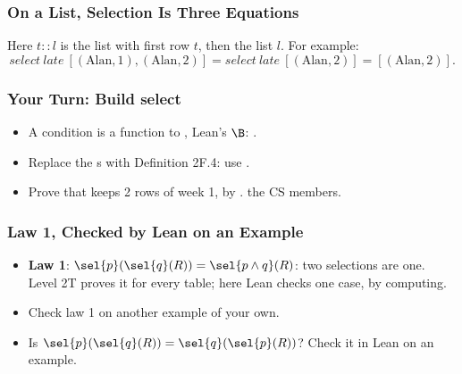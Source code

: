\documentclass{ltx-talk}
\begin{document}
\begin{frame}
  \frametitle{On a List, Selection Is Three Equations}
  Here $t :: l$ is the list with first row $t$, then the list $l$. For
  example:
  \[
    \mathit{select}\ \mathit{late}\ [(\text{Alan}, 1), (\text{Alan}, 2)]
    = \mathit{select}\ \mathit{late}\ [(\text{Alan}, 2)]
    = [(\text{Alan}, 2)].
  \]
\end{frame}


\begin{frame*}
  \frametitle{Your Turn: Build select}
  \begin{itemize}
    \item A condition is a function to , Lean's $\B$:
      .
    \item {} Replace the s with Definition 2F.4: use
      .
    \item {} Prove that  keeps 2 rows of week 1, by
      .   the CS members.
  \end{itemize}
\end{frame*}

\begin{frame*}
  \frametitle{Law 1, Checked by Lean on an Example}
  \begin{itemize}
    \item \textbf{Law 1}: $\sel{p}(\sel{q}(R)) = \sel{p \wedge q}(R)$:
      two selections are one. Level 2T proves it for every table; here
      Lean checks one case, by computing.
    \item {} Check law 1 on another example of your own.
    \item {} Is $\sel{p}(\sel{q}(R)) = \sel{q}(\sel{p}(R))$?
      Check it in Lean on an example.
  \end{itemize}
\end{frame*}
\end{document}
